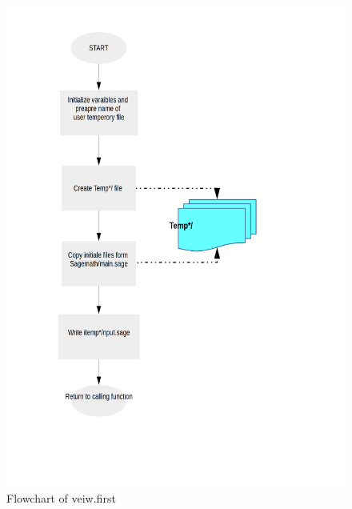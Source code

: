 \begin{figure}[H]
\centering \includegraphics[scale=0.27]{images/flowchartfirst.png}
\caption{Flowchart of veiw.first}
\end{figure}

